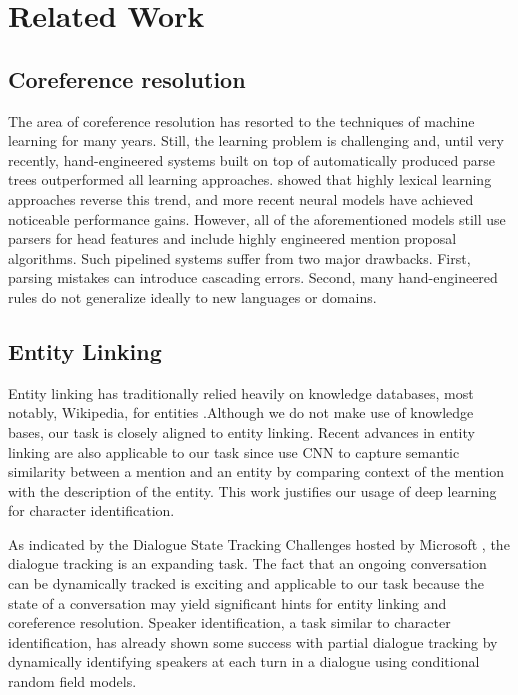 \documentclass[11pt]{article}
\begin{document}
\section{Related Work}

\subsection{Coreference resolution}

The area of coreference resolution has resorted to the techniques of machine learning for many years. Still, the learning problem is challenging and, until very recently, hand-engineered systems built on top of automatically produced parse trees \cite{Raghunathan:2010:MSC:1870658.1870706} outperformed all learning approaches.\cite{Durrett2013EasyVA} showed that highly lexical learning approaches reverse this trend, and more recent neural models\cite{2016arXiv160403035W,2016arXiv160908667C,2016arXiv160601323C} have achieved noticeable performance gains. However, all of the aforementioned models still use parsers for head features and include highly engineered mention proposal algorithms. Such pipelined systems suffer from two major drawbacks. First, parsing mistakes can introduce cascading errors. Second, many hand-engineered rules do not generalize ideally to new languages or domains.  

\subsection{Entity Linking}

Entity linking has traditionally relied heavily on knowledge databases, most notably, Wikipedia, for entities 
\cite{Mihalcea:2007:WLD:1321440.1321475,2016arXiv160400734F}.Although we do not make use of knowledge bases, our task is closely aligned to entity linking. Recent advances in entity linking are also applicable to our task since \cite{2016arXiv160400734F} use CNN to capture semantic similarity between a mention and an entity by comparing context of the mention with the description of the entity. This work justifies our usage of deep learning for character identification.

As indicated by the Dialogue State Tracking Challenges hosted by Microsoft  \cite{Fourth}, the dialogue tracking is an expanding task. The fact that an ongoing conversation can be dynamically tracked \cite{henderson-thomson-young:2013:SIGDIAL}is exciting and applicable to our task because the state of a conversation may yield significant hints for entity linking and coreference resolution. Speaker identification, a task similar to character identification, has already shown some success with partial dialogue tracking by dynamically identifying speakers at each turn in a dialogue using conditional random field models.
\end{document}
